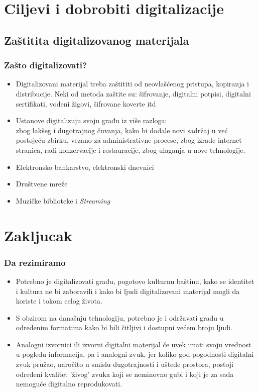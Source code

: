 \documentclass{beamer}
\begin{document}
\section{Ciljevi i dobrobiti digitalizacije}
\subsection{Zaštitita digitalizovanog materijala}
\begin{frame}[fragile]\frametitle{Zašto digitalizovati?}
	\begin{itemize}	
		\item Digitalizovani materijal treba zaštititi od neovlašćenog pristupa, kopiranja i distribucije. Neki od metoda zaštite su: 
		šifrovanje, digitalni potpisi, digitalni sertifikati, vodeni žigovi, šifrovane koverte itd 
		\item Ustanove digitalizuju svoju građu iz više razloga:\\
		zbog lakšeg i dugotrajnog čuvanja, kako bi dodale novi sadržaj u već postojeću zbirku, vezano za administrativne procese, zbog izrade internet stranica, radi konzervacije i restauracije, zbog ulaganja u nove tehnologije.
		\item Elektronsko bankarstvo, elektronski dnevnici
		\item Društvene mreže
		\item Muzičke biblioteke i \textit{Streaming}
	\end{itemize}
\end{frame}

\section{Zakljucak}

\begin{frame}[fragile]\frametitle{Da rezimiramo}
	\begin{itemize}	
		\item Potrebno je digitalizovati građu, pogotovo kulturnu baštinu, kako se identitet i kultura ne bi zaboravili i kako bi ljudi  
		digitalizovani materijal mogli da koriste i tokom celog života.
		\item S obzirom na današnju tehnologiju, potrebno je i održavati građu u odredenim formatima kako bi bili čitljivi i dostupni većem broju ljudi.
		\item Analogni izvornici ili izvorni digitalni materijal će uvek imati svoju vrednost u pogledu informacija, pa i analogni zvuk, 
		jer koliko god pogodnosti digitalni zvuk pružao, naročito u smislu dugotrajnosti i uštede prostora, 
		postoji određeni kvalitet 'živog' zvuka koji se neminovno gubi i koji je za sada nemoguće digitalno reprodukovati.
	\end{itemize}
	
\end{frame}
\end{document}

